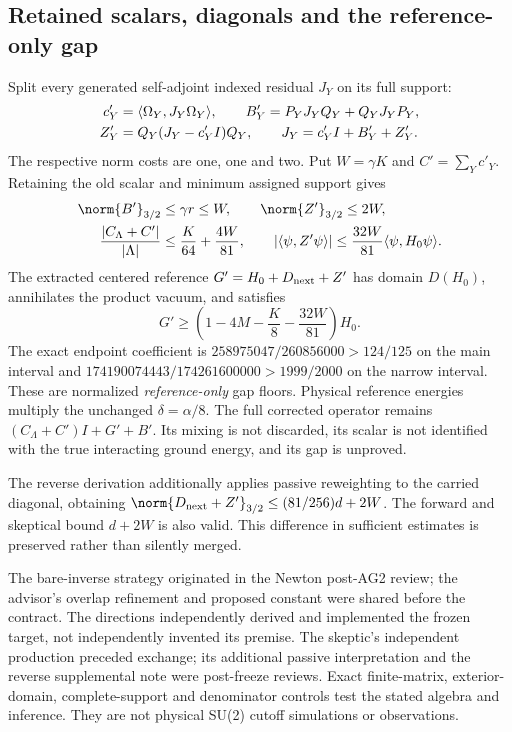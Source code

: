 \subsection{Retained scalars, diagonals and the reference-only gap}
Split every generated self-adjoint indexed residual $J_Y$ on its full support:
\begin{align}
 c'_Y&=\langle\Omega_Y,J_Y\Omega_Y\rangle,\qquad
 B'_Y=P_YJ_YQ_Y+Q_YJ_YP_Y,\notag\\
 Z'_Y&=Q_Y(J_Y-c'_YI)Q_Y,
 \qquad J_Y=c'_YI+B'_Y+Z'_Y.
\end{align}
The respective norm costs are one, one and two. Put $W=\gamma K$ and $C'=\sum_Yc'_Y$. Retaining the old scalar and minimum assigned support gives
\begin{align}
 \norm{B'}_{3/2}&\le\gamma r\le W,\qquad
 \norm{Z'}_{3/2}\le2W,\notag\\
 \frac{|C_\Lambda+C'|}{|\Lambda|}&\le\frac K{64}+\frac{4W}{81},\qquad
 |\langle\psi,Z'\psi\rangle|\le\frac{32W}{81}\langle\psi,H_0\psi\rangle.
 \label{r28:eq:ag3-scalar-diagonal}
\end{align}
The extracted centered reference $G'=H_0+D_{\rm next}+Z'$ has domain $D(H_0)$, annihilates the product vacuum, and satisfies
\begin{equation}
 G'\ge\left(1-4M-\frac K8-\frac{32W}{81}\right)H_0.
 \label{r28:eq:ag3-reference}
\end{equation}
The exact endpoint coefficient is $258975047/260856000>124/125$ on the main interval and $174190074443/174261600000>1999/2000$ on the narrow interval. These are normalized \emph{reference-only} gap floors. Physical reference energies multiply the unchanged $\delta=\alpha/8$. The full corrected operator remains $(C_\Lambda+C')I+G'+B'$. Its mixing is not discarded, its scalar is not identified with the true interacting ground energy, and its gap is unproved.

The reverse derivation additionally applies passive reweighting to the carried diagonal, obtaining $\norm{D_{\rm next}+Z'}_{3/2}\le(81/256)d+2W$. The forward and skeptical bound $d+2W$ is also valid. This difference in sufficient estimates is preserved rather than silently merged.

The bare-inverse strategy originated in the Newton post-AG2 review; the advisor's overlap refinement and proposed constant were shared before the contract. The directions independently derived and implemented the frozen target, not independently invented its premise. The skeptic's independent production preceded exchange; its additional passive interpretation and the reverse supplemental note were post-freeze reviews. Exact finite-matrix, exterior-domain, complete-support and denominator controls test the stated algebra and inference. They are not physical SU(2) cutoff simulations or observations.

